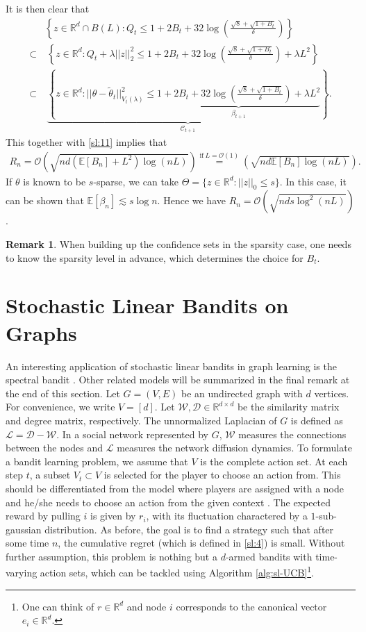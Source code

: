 \documentclass[letterpaper,11pt,openright,openany]{book}
\numberwithin{equation}{section}
\theoremstyle{plain}
\theoremstyle{definition}
\newtheorem{Rem}[Th]{Remark}
\def\R{{\mathbb R}}
\def\E{{\mathbb E}}
\def\R{{\mathbb R}}
\def\t{{\theta}}
\begin{document}
It is then clear that 
\begin{align*}
&\left\{z\in\R^d\cap B(L): Q_t\leq 1+2B_t+32\log\left(\frac{\sqrt{8}+\sqrt{1+B_t}}{\delta}\right) \right\}\\
\subset&\ \left\{z\in\R^d: Q_t +\lambda ||z||_2^2\leq 1+2B_t+32\log\left(\frac{\sqrt{8}+\sqrt{1+B_t}}{\delta}\right) +\lambda L^2\right\}\\
\subset&\ \underbrace{\left\{z\in\R^d: ||\t-\tilde\t_t||^2_{V_t(\lambda)}\leq \underbrace{1+2B_t+32\log\left(\frac{\sqrt{8}+\sqrt{1+B_t}}{\delta}\right)+\lambda L^2}_{\beta_{t+1}} \right\}}_{\mathcal C_{t+1}}. 
\end{align*}
This together with \eqref{sl:11} implies that 
\begin{align*}
R_n = \mathcal O \left(\sqrt{nd(\E[B_n]+L^2)\log(nL)}\right)\stackrel{\text{if}\ L=\mathcal O(1)}{=}\left(\sqrt{nd\E[B_n]\log(nL)}\right).
\end{align*}
If $\t$ is known to be $s$-sparse, we can take $\Theta = \{z\in\R^d: ||z||_0\leq s\}$. In this case, it can be shown that $\E[\beta_n] \lesssim s\log n$. Hence we have $R_n = \mathcal O \left(\sqrt{nds\log^2(nL)}\right)$.
\begin{Rem}
When building up the confidence sets in the sparsity case, one needs to know the sparsity level in advance, which determines the choice for $B_t$. 
\end{Rem} 



\section{Stochastic Linear Bandits on Graphs}
An interesting application of stochastic linear bandits in graph learning is the spectral bandit \cite{valko2014spectral}. 
Other related models will be summarized in the final remark at the end of this section. 
Let $G=(V, E)$ be an undirected graph with $d$ vertices. 
For convenience, we write $V=[d]$. 
Let $\mathcal W, \mathcal D\in\R^{d\times d}$ be the similarity matrix and degree matrix, respectively. 
The unnormalized Laplacian of $G$ is defined as $\mathcal L=\mathcal D-\mathcal W$. 
In a social network represented by $G$, $\mathcal W$ measures the connections between the nodes and $\mathcal L$ measures the network diffusion dynamics. 
To formulate a bandit learning problem, we assume that $V$ is the complete action set.
At each step $t$, a subset $V_t\subset V$ is selected for the player to choose an action from.
This should be differentiated from the model where players are assigned with a node and he/she needs to choose an action from the given context \cite{cesa2013gang}.  
The expected reward by pulling $i$ is given by $r_i$, with its fluctuation charactered by a $1$-sub-gaussian distribution. 
As before, the goal is to find a strategy such that after some time $n$, the cumulative regret (which is defined in \eqref{sl:4}) is small.  
Without further assumption, this problem is nothing but a $d$-armed bandits with time-varying action sets, which can be tackled using Algorithm \ref{alg:sl-UCB}\footnote{One can think of $r\in\R^d$ and node $i$ corresponds to the canonical vector $e_i\in\R^d$. }. 
\end{document}
